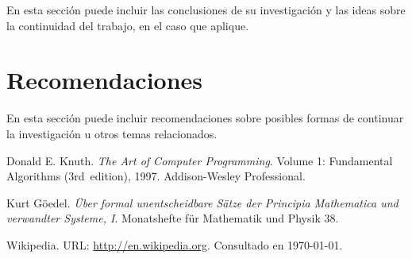 \documentclass[a4paper,10pt,twocolumn]{article}
\begin{document}
  En esta sección puede incluir las conclusiones de su investigación y las ideas
  sobre la continuidad del trabajo, en el caso que aplique.




\section{Recomendaciones}\label{sec:rec}

  En esta sección puede incluir recomendaciones sobre posibles formas de continuar
  la investigación u otros temas relacionados.




\begin{thebibliography}{99}
	 Donald E. Knuth. \emph{The Art of Computer Programming}.
		Volume 1: Fundamental Algorithms (3rd~edition), 1997.
		Addison-Wesley Professional.

	 Kurt Göedel. \emph{Über formal unentscheidbare Sätze der
		Principia Mathematica und verwandter Systeme, I}.
		Monatshefte für Mathematik und Physik 38.

	 Wikipedia. URL: \href{http://en.wikipedia.org}
	  {http://en.wikipedia.org}.
		Consultado en \today.

\end{thebibliography}


\label{end}
\end{document}
